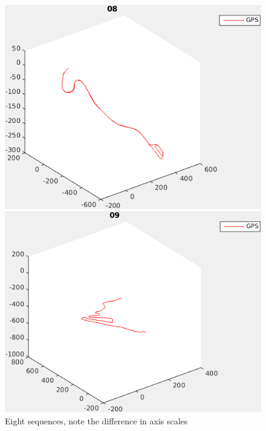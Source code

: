 \documentclass{report}
\begin{document}
\begin{figure}
  \begin{minipage}[b]{.5\textwidth}
    \centering
    \includegraphics[width=.9\textwidth]{08_path}
  \end{minipage}%
  \begin{minipage}[b]{.5\textwidth}
    \centering
    \includegraphics[width=.9\textwidth]{09_path}
  \end{minipage}
  \caption{Eight sequences, note the difference in axis scales}
\end{figure}
\end{document}
